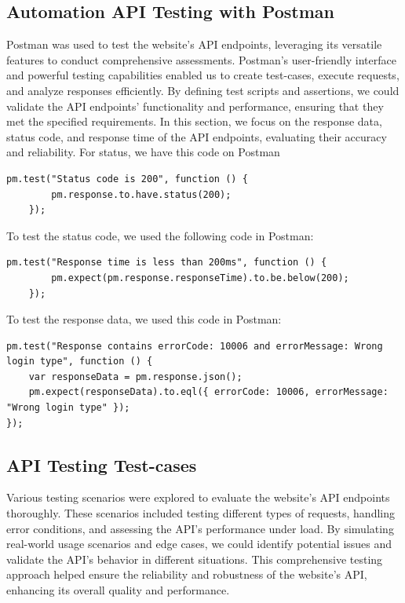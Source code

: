 \subsection{Automation API Testing with Postman}
Postman was used to test the website's API endpoints, leveraging its
versatile features to conduct comprehensive assessments. Postman's
user-friendly interface and powerful testing capabilities enabled us to
create test-cases, execute requests, and analyze responses efficiently.
By defining test scripts and assertions, we could validate the API
endpoints' functionality and performance, ensuring that they met the
specified requirements.
In this section, we focus on the response data, status code, and response
time of the API endpoints, evaluating their accuracy and reliability.
For status, we have this code on Postman
\begin{lstlisting}[caption=Code to test status code, label={lst:status-code}]
    pm.test("Status code is 200", function () {
        pm.response.to.have.status(200);
    });
\end{lstlisting}
To test the status code, we used the following code in Postman:
\begin{lstlisting}[caption=Code to test response time, label={lst:response-time}]
    pm.test("Response time is less than 200ms", function () {
        pm.expect(pm.response.responseTime).to.be.below(200);
    });
\end{lstlisting}
To test the response data, we used this code in Postman:
\begin{lstlisting}[caption=Code to test response data, label={lst:response-data}]
    pm.test("Response contains errorCode: 10006 and errorMessage: Wrong login type", function () {
    var responseData = pm.response.json();
    pm.expect(responseData).to.eql({ errorCode: 10006, errorMessage: "Wrong login type" });
});
\end{lstlisting}

\subsection{API Testing Test-cases}
Various testing scenarios were explored to evaluate the website's API
endpoints thoroughly. These scenarios included testing different types of
requests, handling error conditions, and assessing the API's performance
under load. By simulating real-world usage scenarios and edge cases, we
could identify potential issues and validate the API's behavior in
different situations. This comprehensive testing approach helped ensure
the reliability and robustness of the website's API, enhancing its overall
quality and performance. 

